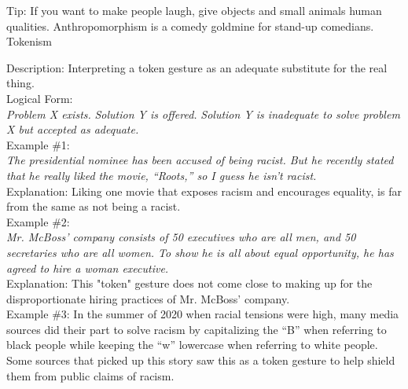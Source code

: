 \documentclass[a4paper,12pt,single,pdftex]{scrbook}
\begin{document}
    
      Tip: If you want to make people laugh, give objects and small animals human qualities. Anthropomorphism is a comedy goldmine for stand-up comedians.
    \\

  

Tokenism
    
      
        Description: Interpreting a token gesture as an adequate substitute for the real thing.
      \\

      
        Logical Form:
      \\

      
        {\em Problem X exists.} \newline
{\em Solution Y is offered.} \newline
{\em Solution Y is inadequate to solve problem X but accepted as adequate.}
      \\

      
        Example \#1:
      \\

      
        {\em The presidential nominee has been accused of being racist.  But he recently stated that he really liked the movie, “Roots,” so I guess he isn’t racist.}
      \\

      
        Explanation: Liking one movie that exposes racism and encourages equality, is far from the same as not being a racist.
      \\

      
        Example \#2:
      \\

      
        {\em Mr. McBoss' company consists of 50 executives who are all men, and 50 secretaries who are all women.  To show he is all about equal opportunity, he has agreed to hire a woman executive.}
      \\

      
        Explanation: This "token" gesture does not come close to making up for the disproportionate hiring practices of Mr. McBoss' company.
      \\

      
        Example \#3: In the summer of 2020 when racial tensions were high, many media sources did their part to solve racism by capitalizing the “B” when referring to black people while keeping the “w” lowercase when referring to white people. Some sources that picked up this story saw this as a token gesture to help shield them from public claims of racism.
      \\
\end{document}
